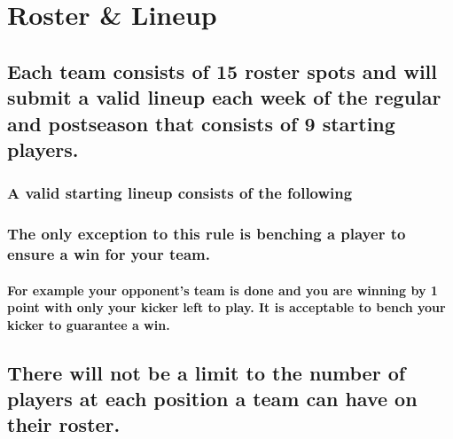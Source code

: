 \documentclass[]{book}
\let\oldparagraph\paragraph
\renewcommand{\paragraph}[1]{\oldparagraph{#1}\mbox{}}
\begin{document}
\hypertarget{roster-lineup}{%
\section{Roster \& Lineup}\label{roster-lineup}}

\hypertarget{each-team-consists-of-15-roster-spots-and-will-submit-a-valid-lineup-each-week-of-the-regular-and-postseason-that-consists-of-9-starting-players.}{%
\subsection{Each team consists of 15 roster spots and will submit a valid lineup each week of the regular and postseason that consists of 9 starting players.}\label{each-team-consists-of-15-roster-spots-and-will-submit-a-valid-lineup-each-week-of-the-regular-and-postseason-that-consists-of-9-starting-players.}}

\hypertarget{a-valid-starting-lineup-consists-of-the-following}{%
\subsubsection{A valid starting lineup consists of the following}\label{a-valid-starting-lineup-consists-of-the-following}}

\hypertarget{the-only-exception-to-this-rule-is-benching-a-player-to-ensure-a-win-for-your-team.}{%
\subsubsection{The only exception to this rule is benching a player to ensure a win for your team.}\label{the-only-exception-to-this-rule-is-benching-a-player-to-ensure-a-win-for-your-team.}}

\hypertarget{for-example-your-opponents-team-is-done-and-you-are-winning-by-1-point-with-only-your-kicker-left-to-play.-it-is-acceptable-to-bench-your-kicker-to-guarantee-a-win.}{%
\paragraph{For example your opponent's team is done and you are winning by 1 point with only your kicker left to play. It is acceptable to bench your kicker to guarantee a win.}\label{for-example-your-opponents-team-is-done-and-you-are-winning-by-1-point-with-only-your-kicker-left-to-play.-it-is-acceptable-to-bench-your-kicker-to-guarantee-a-win.}}

\hypertarget{there-will-not-be-a-limit-to-the-number-of-players-at-each-position-a-team-can-have-on-their-roster.}{%
\subsection{There will not be a limit to the number of players at each position a team can have on their roster.}\label{there-will-not-be-a-limit-to-the-number-of-players-at-each-position-a-team-can-have-on-their-roster.}}
\end{document}
